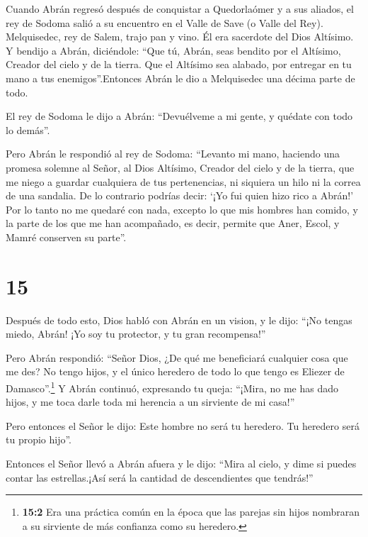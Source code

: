  Cuando Abrán regresó después de conquistar a Quedorlaómer
y a sus aliados, el rey de Sodoma salió a su encuentro en el Valle de
Save (o Valle del Rey).  Melquisedec, rey de Salem, trajo
pan y vino. Él era sacerdote del Dios Altísimo.  Y bendijo
a Abrán, diciéndole: ``Que tú, Abrán, seas bendito por el Altísimo,
Creador del cielo y de la tierra.  Que el Altísimo sea
alabado, por entregar en tu mano a tus enemigos''.Entonces Abrán le dio
a Melquisedec una décima parte de todo.

 El rey de Sodoma le dijo a Abrán: ``Devuélveme a mi gente,
y quédate con todo lo demás''.

 Pero Abrán le respondió al rey de Sodoma: ``Levanto mi
mano, haciendo una promesa solemne al Señor, al Dios Altísimo, Creador
del cielo y de la tierra,  que me niego a guardar
cualquiera de tus pertenencias, ni siquiera un hilo ni la correa de una
sandalia. De lo contrario podrías decir: `¡Yo fui quien hizo rico a
Abrán!'  Por lo tanto no me quedaré con nada, excepto lo
que mis hombres han comido, y la parte de los que me han acompañado, es
decir, permite que Aner, Escol, y Mamré conserven su parte''.

\hypertarget{section-14}{%
\section{15}\label{section-14}}

 Después de todo esto, Dios habló con Abrán en un vision, y
le dijo: ``¡No tengas miedo, Abrán! ¡Yo soy tu protector, y tu gran
recompensa!''

 Pero Abrán respondió: ``Señor Dios, ¿De qué me beneficiará
cualquier cosa que me des? No tengo hijos, y el único heredero de todo
lo que tengo es Eliezer de Damasco''.\footnote{\textbf{15:2} Era una
  práctica común en la época que las parejas sin hijos nombraran a su
  sirviente de más confianza como su heredero.}  Y Abrán
continuó, expresando tu queja: ``¡Mira, no me has dado hijos, y me toca
darle toda mi herencia a un sirviente de mi casa!''

 Pero entonces el Señor le dijo: Este hombre no será tu
heredero. Tu heredero será tu propio hijo''.

 Entonces el Señor llevó a Abrán afuera y le dijo: ``Mira al
cielo, y dime si puedes contar las estrellas.¡Así será la cantidad de
descendientes que tendrás!''

